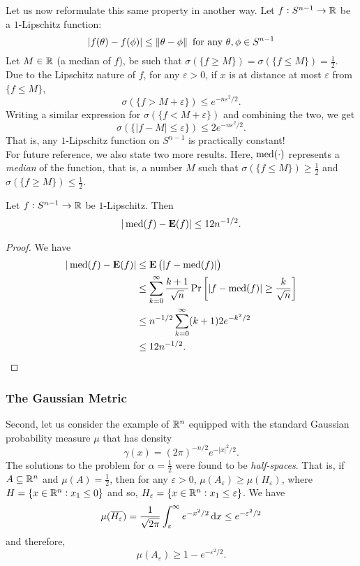 Let us now reformulate this same property in another way. Let $f:S^{n-1}\to\mathbb{R}$ be a $1$-Lipschitz function:
\[ |f(\theta)-f(\phi)|\leq\left\lVert\theta-\phi\right\rVert\text{ for any }\theta,\phi\in S^{n-1}\]
Let $M\in\mathbb{R}$ (a median of $f$), be such that $\sigma(\{f\geq M\})=\sigma(\{f\leq M\})=\frac{1}{2}$. Due to the Lipschitz nature of $f$, for any $\varepsilon>0$, if $x$ is at distance at most $\varepsilon$ from $\{f\leq M\}$,
\[ \sigma(\{f > M+\varepsilon\}) \leq e^{-n\varepsilon^2/2}. \]
Writing a similar expression for $\sigma(\{f < M+\varepsilon\})$ and combining the two, we get
\[ \sigma(\{|f-M| \leq \varepsilon\}) \leq 2e^{-n\varepsilon^2/2}. \]
That is, any $1$-Lipschitz function on $S^{n-1}$ is practically constant!\\

For future reference, we also state two more results. Here, $\operatorname{med}(\cdot)$ represents a \textit{median} of the function, that is, a number $M$ such that $\sigma(\{f\leq M\})\geq\frac{1}{2}$ and $\sigma(\{f\geq M\})\leq\frac{1}{2}$.

\begin{lemma}
\label{lipschitz function median expectation bound}
Let $f:S^{n-1}\to\mathbb{R}$ be $1$-Lipschitz. Then
\[ |\operatorname{med}(f)-\textbf{E}(f)| \leq 12n^{-1/2}. \]
\end{lemma}
\begin{proof}
We have
\begin{align*}
    |\operatorname{med}(f) - \textbf{E}(f)| &\leq \textbf{E}\left(|f-\operatorname{med}(f)|\right) \\
    &\leq \sum_{k=0}^\infty \frac{k+1}{\sqrt{n}} \Pr\left[|f-\operatorname{med}(f)| \geq \frac{k}{\sqrt{n}}\right] \\
    &\leq n^{-1/2} \sum_{k=0}^\infty (k+1) 2e^{-k^2/2} \\
    &\leq 12n^{-1/2}.
\end{align*}
\end{proof}

\subsubsection{The Gaussian Metric}

Second, let us consider the example of $\mathbb{R}^n$ equipped with the standard Gaussian probability measure $\mu$ that has density
\[ \gamma(x) = (2\pi)^{-n/2} e^{-|x|^2/2}. \]
The solutions to the problem for $\alpha=\frac{1}{2}$ were found to be \textit{half-spaces}. That is, if $A\subseteq\mathbb{R}^n$ and $\mu(A) = \frac{1}{2}$, then for any $\varepsilon>0$, $\mu(A_\varepsilon)\geq\mu(H_\varepsilon)$, where $H=\{x\in\mathbb{R}^n:x_1\leq 0\}$ and so, $H_\varepsilon = \{x\in\mathbb{R}^n:x_1\leq\varepsilon\}$. We have
\[ \mu(\overline{H_\varepsilon}) = \frac{1}{\sqrt{2\pi}}\int_\varepsilon^\infty e^{-x^2/2}\operatorname{d}\!{x} \leq e^{-\varepsilon^2/2} \]
and therefore,
\[ \mu(A_\varepsilon) \geq 1 - e^{-\varepsilon^2/2}. \]

